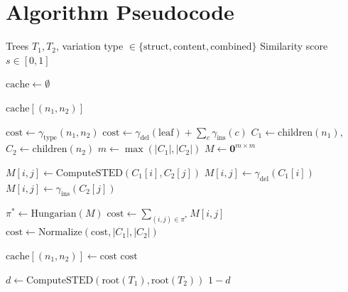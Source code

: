 \documentclass{article}
\begin{document}
\section{Algorithm Pseudocode}

\begin{algorithm}[h]
\caption{STED Similarity Computation}
\label{alg:sted}
\begin{algorithmic}[1]
\REQUIRE Trees $T_1, T_2$, variation type $\in \{\text{struct}, \text{content}, \text{combined}\}$
\ENSURE Similarity score $s \in [0, 1]$

\STATE $\text{cache} \gets \emptyset$ 

        \RETURN $\text{cache}[(n_1, n_2)]$
    \ENDIF

        \STATE $\text{cost} \gets \gamma_{\text{type}}(n_1, n_2)$ 
        \STATE $\text{cost} \gets \gamma_{\text{del}}(\text{leaf}) + \sum_{c} \gamma_{\text{ins}}(c)$
    \ELSE
        \STATE $C_1 \gets \text{children}(n_1)$, $C_2 \gets \text{children}(n_2)$
        \STATE $m \gets \max(|C_1|, |C_2|)$
        \STATE $M \gets \mathbf{0}^{m \times m}$ 

                    \STATE $M[i,j] \gets \text{ComputeSTED}(C_1[i], C_2[j])$
                    \STATE $M[i,j] \gets \gamma_{\text{del}}(C_1[i])$
                    \STATE $M[i,j] \gets \gamma_{\text{ins}}(C_2[j])$
                \ENDIF
            \ENDFOR
        \ENDFOR

        \STATE $\pi^* \gets \text{Hungarian}(M)$ 
        \STATE $\text{cost} \gets \sum_{(i,j) \in \pi^*} M[i,j]$
        \STATE $\text{cost} \gets \text{Normalize}(\text{cost}, |C_1|, |C_2|)$
    \ENDIF

    \STATE $\text{cache}[(n_1, n_2)] \gets \text{cost}$
    \RETURN $\text{cost}$
\ENDFUNCTION

\STATE $d \gets \text{ComputeSTED}(\text{root}(T_1), \text{root}(T_2))$
\RETURN $1 - d$
\end{algorithmic}
\end{algorithm}
\end{document}
